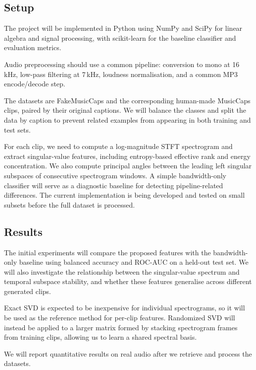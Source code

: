 \documentclass[11pt,a4paper]{article}
\theoremstyle{plain}
\theoremstyle{definition}
\theoremstyle{remark}
\begin{document}
\subsection{Setup}

The project will be implemented in Python using NumPy and SciPy for
linear algebra and signal processing, with scikit-learn for the
baseline classifier and evaluation metrics.

Audio preprocessing should use a common pipeline:
conversion to mono at 16\,kHz, low-pass
filtering at 7\,kHz, loudness normalisation, and a common
MP3 encode/decode step.

The datasets are FakeMusicCaps and the corresponding human-made MusicCaps
clips, paired by their original captions. We will
balance the classes and split the data by caption
to prevent related examples from appearing in both training and
test sets.

For each clip, we need to compute a log-magnitude STFT spectrogram and
extract singular-value features, including entropy-based effective
rank and energy concentration. We also compute principal angles
between the leading left singular subspaces of consecutive
spectrogram windows. A simple bandwidth-only classifier will serve
as a diagnostic baseline for detecting pipeline-related differences.
The current implementation is being developed and tested on small
subsets before the full dataset is processed.

\subsection{Results}

The initial experiments will compare the proposed features with the
bandwidth-only baseline using balanced accuracy and ROC-AUC on a
held-out test set. We will also investigate the relationship between
the singular-value spectrum and temporal subspace stability, and
whether these features generalise across different generated clips.

Exact SVD is expected to be inexpensive for individual
spectrograms, so it will be used as the reference method for
per-clip features. Randomized SVD will instead be applied to a
larger matrix formed by stacking spectrogram frames from training
clips, allowing us to learn a shared spectral basis.

We will report quantitative results on real audio
after we retrieve and process the datasets.

\end{document}
